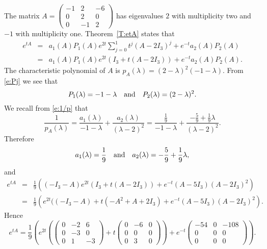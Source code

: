 \documentclass{ximera}
\begin{document}
\begin{exercise}
\begin{solution}
\soln The matrix 
$A = \left(\begin{array}{rrr} -1 & 2 & -6\\ 0 & 2 & 0 \\ 0 & -1 & 2
\end{array}\right)$ has eigenvalues $2$ with multiplicity two and $-1$ 
with multiplicity one. Theorem~\ref{T:etA} states that 
\begin{eqnarray*}
e^{tA} & = & a_1(A)P_1(A)e^{2t}\sum_{j=0}^1t^j(A-2I_3)^j+e^{-t}a_2(A)P_2(A)\\
 & = & a_1(A)P_1(A)e^{2t}(I_3+t(A-2I_3)) + e^{-t}a_2(A)P_2(A).
\end{eqnarray*}
The characteristic polynomial of $A$ is 
$p_A(\lambda) =(2-\lambda)^2(-1-\lambda)$.  From \eqref{e:Pj} we see that
\[
P_1(\lambda) = -1-\lambda \quad\mbox{and}\quad P_2(\lambda) = (2-\lambda)^2.
\]
We recall from \eqref{e:1/p} that 
\[
\frac{1}{p_A(\lambda)} = \frac{a_1(\lambda)}{-1-\lambda} + 
\frac{a_2(\lambda)}{(\lambda-2)^2} = \frac{\frac{1}{9}}{-1-\lambda}
+ \frac{-\frac{5}{9}+\frac{1}{9}\lambda}{(\lambda-2)^2}.
\]
Therefore
\[
a_1(\lambda) = \frac{1}{9} \quad\mbox{and}\quad a_2(\lambda) = -\frac{5}{9}+\frac{1}{9}\lambda,
\]
and
\begin{eqnarray*}
e^{tA} & = & \frac{1}{9}\left((-I_3-A)e^{2t}(I_3+t(A-2I_3)) + 
e^{-t}(A-5I_3)(A-2I_3)^2\right)\\
& = & 
\frac{1}{9}\left(e^{2t}((-I_3-A)+t(-A^2+A+2I_3)+e^{-t}(A-5I_3)(A-2I_3)^2\right).
\end{eqnarray*}
Hence
\[
e^{tA}= \frac{1}{9}\left(e^{2t}\left(\left(\begin{array}{rrr} 0 & -2 & 6\\ 
0 & -3 & 0\\ 0 & 1 & -3\end{array}\right)+t\left(\begin{array}{rrr} 0& -6 & 0\\ 
0 & 0 & 0\\ 0 & 3 & 0 \end{array}\right)\right)+e^{-t}\left(\begin{array}{rrr} 
-54 & 0 & -108\\ 0 & 0 & 0 \\ 0 & 0 & 0\end{array}\right)\right).
\]




\end{solution}
\end{exercise} 
\end{document}
